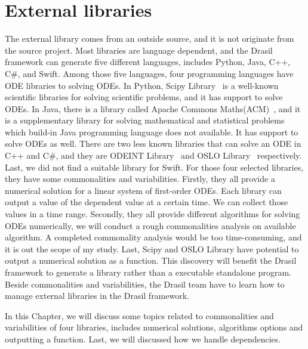 \chapter{External libraries}
The external library comes from an outside source, and it is not originate from the source project. Most libraries are language dependent, and the Drasil framework can generate five different languages, includes Python, Java, C++, C\#, and Swift. Among those five languages, four programming languages have ODE libraries to solving ODEs. In Python, Scipy Library~\citep{scipy} is a well-known scientific libraries for solving scientific problems, and it has support to solve ODEs. In Java, there is a library called Apache Commons Maths(ACM)~\citep{apache}, and it is a supplementary library for solving mathematical and statistical problems which build-in Java programming language does not available. It has support to solve ODEs as well. There are two less known libraries that can solve an ODE in C++ and C\#, and they are ODEINT Library~\citep{odeint} and OSLO Library~\citep{oslo} respectively. Last, we did not find a suitable library for Swift. For those four selected libraries, they have some commonalities and variabilities. Firstly, they all provide a numerical solution for a linear system of first-order ODEs. Each library can output a value of the dependent value at a certain time. We can collect those values in a time range. Secondly, they all provide different algorithms for solving ODEs numerically, we will conduct a rough commonalities analysis on available algorithm. A completed commonality analysis would be too time-consuming, and it is out the scope of my study. Last, Scipy and OSLO Library have potential to output a numerical solution as a function. This discovery will benefit the Drasil framework to generate a library rather than a executable standalone program. Beside commonalities and variabilities, the Drasil team have to learn how to manage external libraries in the Drasil framework.

In this Chapter, we will discuss some topics related to commonalities and variabilities of four libraries, includes numerical solutions, algorithms options and outputting a function. Last, we will discussed how we handle dependencies.

